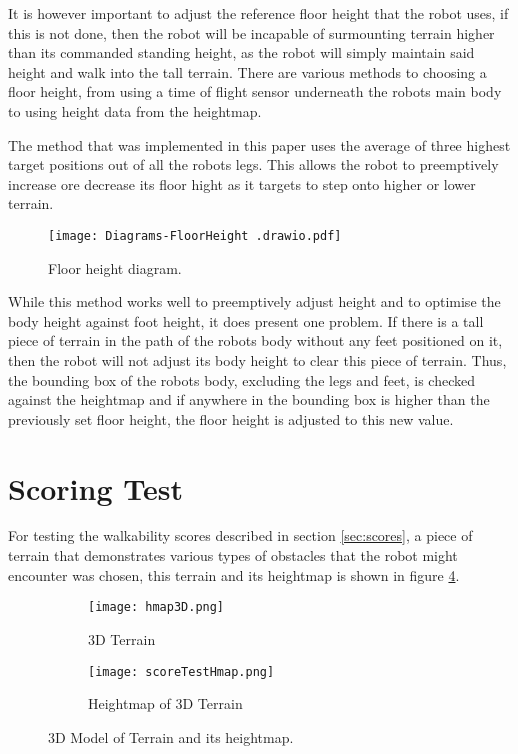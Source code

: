     It is however important to adjust the reference floor height that the robot uses, if this is not done, then the robot will be
    incapable of surmounting terrain higher than its commanded standing height, as the robot will simply maintain said height and walk into the tall terrain.
    There are various methods to choosing a floor height, from using 
    a time of flight sensor underneath the robots main body to using height data from the heightmap.

    The method that was implemented in this paper uses the average of three highest target positions out of all the robots legs.
    This allows the robot to preemptively increase ore decrease its floor hight as it targets to step onto higher or lower terrain.

    \begin{figure}[h]
        \centering
        \texttt{[image: Diagrams-FloorHeight .drawio.pdf]}
        \caption{Floor height diagram.}
        \label{fig:floor_height}
    \end{figure}

    While this method works well to preemptively adjust height and to optimise the body height against foot height, it does present one problem. If there is a tall piece of terrain in the path of the robots body
    without any feet positioned on it, then the robot will not adjust its body height to clear this piece of terrain. 
    Thus, the bounding box of the robots body, excluding the legs and feet, is checked against the heightmap
    and if anywhere in the bounding box is higher than the previously set floor height, the floor height is adjusted to this new value.

    \newpage
    \section{Scoring Test} \label{sec:test_scores}
    For testing the walkability scores described in section \ref{sec:scores}, a piece of terrain that demonstrates various types of obstacles
    that the robot might encounter was chosen, this terrain and its heightmap is shown in figure \ref{fig:score_test_map}.
    \begin{figure}[h]
        \centering
        \begin{subfigure}{.5\textwidth}
            \texttt{[image: hmap3D.png]}
            \caption{3D Terrain}
            \label{fig:sub_3d_terrain}
        \end{subfigure}%
        \begin{subfigure}{.5\textwidth}
            \texttt{[image: scoreTestHmap.png]}
            \caption{Heightmap of 3D Terrain}
            \label{fig:sub_3d_terrain_hmap}
        \end{subfigure}
        \caption{3D Model of Terrain and its heightmap.}
        \label{fig:score_test_map}
    \end{figure}

